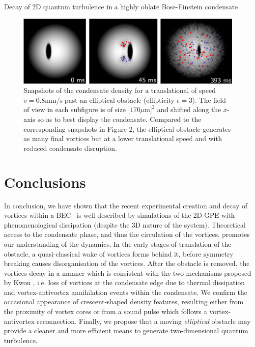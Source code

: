 \begin{chapter}{\label{cha:shin}Decay of 2D quantum turbulence in a highly oblate Bose-Einstein condensate}
\begin{figure}
\centering
\includegraphics[width=0.9\linewidth]{shin/fig6.png}
\caption{\label{fig:ellipse} Snapshots of the condensate density for a translational of speed $v=0.8$mm/s past an elliptical obstacle (ellipticity $\epsilon=3$). The field of view in each subfigure is of size $[170\mu$m$]^2$ and shifted along the $x$-axis so as to best display the condensate.  Compared to the corresponding snapshots in Figure 2, the elliptical obstacle generates as many final vortices but at a lower translational speed and with reduced condensate disruption.
}
\end{figure}
\section{Conclusions}
In conclusion, we have shown that the recent experimental creation and decay of vortices within a BEC~\citep{kwon_moon_14} is well described by simulations of the 2D GPE with phenomenological dissipation (despite the 3D nature of the system).  Theoretical access to the condensate phase, and thus the circulation of the vortices, promotes our understanding of the dynamics.  In the early stages of 
translation of the obstacle, a quasi-classical wake of vortices 
forms behind it, before symmetry breaking causes disorganisation 
of the vortices.  After the obstacle is removed, 
the vortices decay in a manner which is consistent with the two mechanisms proposed by 
Kwon \etalcc, i.e. loss of vortices at the condensate edge due to thermal dissipation and vortex-antivortex 
annihilation events within the condensate. 
We confirm the occasional appearance of 
crescent-shaped density features, resulting either from the proximity 
of vortex cores or from a sound pulse which follows a 
vortex-antivortex reconnection.  Finally, we propose that a moving {\it elliptical} obstacle may provide a cleaner and more efficient means to generate two-dimensional quantum turbulence.

\end{chapter}
